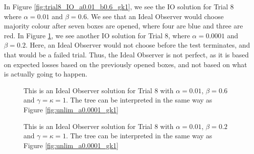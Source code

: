 In Figure \ref{fig:trial8_IO_a0.01_b0.6_gk1}, we see the IO solution for Trial 8 where $\alpha=0.01$ and $\beta=0.6$. We see that an Ideal Observer would choose majority colour after seven boxes are opened, where four are blue and three are red. In Figure \ref{fig:trial8_IO_a0.0001_b0.2_gk1}, we see another IO solution for Trial 8, where $\alpha=0.0001$ and $\beta=0.2$. Here, an Ideal Observer would not choose before the test terminates, and that would be a failed trial. Thus, the Ideal Observer is not perfect, as it is based on expected losses based on the previously opened boxes, and not based on what is actually going to happen.
\begin{figure}
    \centering
     \begin{minipage}[t]{0.45\textwidth}
        \centering
        \scalebox{0.7}{}
        \caption[IO solution, Trial 8. $\alpha=0.01$, $\beta=0.6$ and $\gamma=\kappa=1$.]{This is an Ideal Observer solution for Trial 8 with $\alpha=0.01$, $\beta=0.6$ and $\gamma=\kappa=1$. The tree can be interpreted in the same way as Figure \ref{fig:unlim_a0.0001_gk1}}
        \label{fig:trial8_IO_a0.01_b0.6_gk1}
     \end{minipage}\hfill
     \begin{minipage}[t]{0.45\textwidth}
        \centering
        \scalebox{0.7}{}
        \caption[IO solution, Trial 8. $\alpha=0.0001$, $\beta=0.2$ and $\gamma=\kappa=1$.]{This is an Ideal Observer solution for Trial 8 with $\alpha=0.01$, $\beta=0.2$ and $\gamma=\kappa=1$. The tree can be interpreted in the same way as Figure \ref{fig:unlim_a0.0001_gk1}}
        \label{fig:trial8_IO_a0.0001_b0.2_gk1}
     \end{minipage}
\end{figure}





